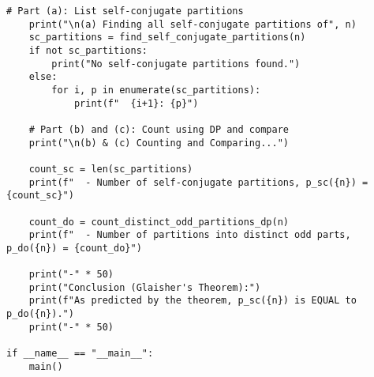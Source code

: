 \documentclass[a4paper,12pt]{article}
\begin{document}
\begin{lstlisting}[style=pythonstyle, caption={Self-conjugate and Distinct-Odd Partitions in Python.}, label={lst:python_self_conj}]
    # Part (a): List self-conjugate partitions
    print("\n(a) Finding all self-conjugate partitions of", n)
    sc_partitions = find_self_conjugate_partitions(n)
    if not sc_partitions:
        print("No self-conjugate partitions found.")
    else:
        for i, p in enumerate(sc_partitions):
            print(f"  {i+1}: {p}")
    
    # Part (b) and (c): Count using DP and compare
    print("\n(b) & (c) Counting and Comparing...")
    
    count_sc = len(sc_partitions)
    print(f"  - Number of self-conjugate partitions, p_sc({n}) = {count_sc}")
    
    count_do = count_distinct_odd_partitions_dp(n)
    print(f"  - Number of partitions into distinct odd parts, p_do({n}) = {count_do}")
    
    print("-" * 50)
    print("Conclusion (Glaisher's Theorem):")
    print(f"As predicted by the theorem, p_sc({n}) is EQUAL to p_do({n}).")
    print("-" * 50)

if __name__ == "__main__":
    main()
\end{lstlisting}
\end{document}
